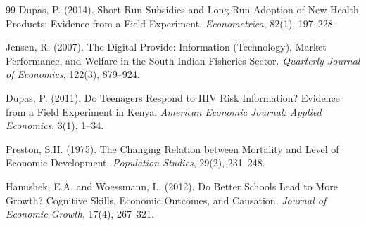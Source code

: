 \documentclass[12pt,a4paper]{article}
\begin{document}
\begin{thebibliography}{99}
Dupas, P. (2014).
Short-Run Subsidies and Long-Run Adoption of New Health Products: Evidence from a Field Experiment.
\emph{Econometrica}, 82(1), 197--228.

Jensen, R. (2007).
The Digital Provide: Information (Technology), Market Performance, and Welfare in the South Indian Fisheries Sector.
\emph{Quarterly Journal of Economics}, 122(3), 879--924.

Dupas, P. (2011).
Do Teenagers Respond to HIV Risk Information? Evidence from a Field Experiment in Kenya.
\emph{American Economic Journal: Applied Economics}, 3(1), 1--34.

Preston, S.H. (1975).
The Changing Relation between Mortality and Level of Economic Development.
\emph{Population Studies}, 29(2), 231--248.

Hanushek, E.A. and Woessmann, L. (2012).
Do Better Schools Lead to More Growth? Cognitive Skills, Economic Outcomes, and Causation.
\emph{Journal of Economic Growth}, 17(4), 267--321.

\end{thebibliography}




\end{document}
